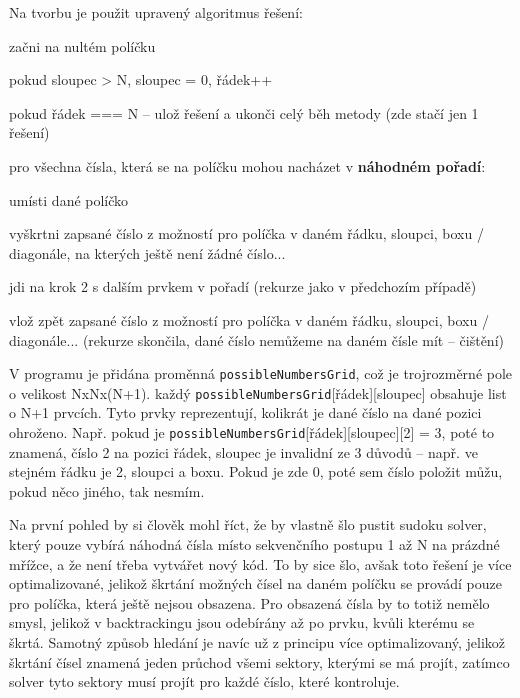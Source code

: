 \documentclass[a4paper,oneside,12pt]{report}
\begin{document}
Na tvorbu je použit upravený algoritmus řešení:
\begin{algEnumerate}
   \item začni na nultém políčku
   \item pokud sloupec > N, sloupec = 0, řádek++
   \item pokud řádek === N -- ulož řešení a ukonči celý běh metody (zde stačí jen 1 řešení)
   \item pro všechna čísla, která se na políčku mohou nacházet v \textbf{náhodném pořadí}:
   \begin{algEnumerate}
      \item umísti dané políčko
      \item vyškrtni zapsané číslo z možností pro políčka v daném řádku, sloupci, boxu / diagonále, na kterých ještě není žádné číslo...
      \item jdi na krok 2 s dalším prvkem v pořadí (rekurze jako v předchozím případě)
      \item vlož zpět zapsané číslo z možností pro políčka v daném řádku, sloupci, boxu / diagonále... (rekurze skončila, dané číslo nemůžeme na daném čísle mít -- čištění)
   \end{algEnumerate}
\end{algEnumerate}

V programu je přidána proměnná \texttt{possibleNumbersGrid}, což je trojrozměrné pole o velikost NxNx(N+1). každý \texttt{possibleNumbersGrid}[řádek][sloupec] obsahuje list o N+1 prvcích. Tyto prvky reprezentují, kolikrát je dané číslo na dané pozici ohroženo. Např. pokud je \texttt{possibleNumbersGrid}[řádek][sloupec][2] = 3, poté to znamená, číslo 2 na pozici řádek, sloupec je invalidní ze 3 důvodů -- např. ve stejném řádku je 2, sloupci a boxu. Pokud je zde 0, poté sem číslo položit můžu, pokud něco jiného, tak nesmím.

Na první pohled by si člověk mohl říct, že by vlastně šlo pustit sudoku solver, který pouze vybírá náhodná čísla místo sekvenčního postupu 1 až N na prázdné mřížce, a že není třeba vytvářet nový kód. To by sice šlo, avšak toto řešení je více optimalizované, jelikož škrtání možných čísel na daném políčku se provádí pouze pro políčka, která ještě nejsou obsazena. Pro obsazená čísla by to totiž nemělo smysl, jelikož v backtrackingu jsou odebírány až po prvku, kvůli kterému se škrtá. Samotný způsob hledání je navíc už z principu více optimalizovaný, jelikož škrtání čísel znamená jeden průchod všemi sektory, kterými se má projít, zatímco solver tyto sektory musí projít pro každé číslo, které kontroluje.
\end{document}
